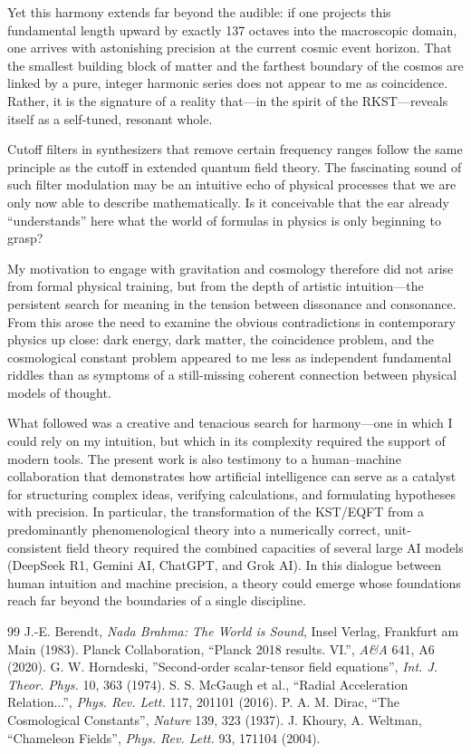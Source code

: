 \documentclass[11pt,a4paper]{article}
\begin{document}
Yet this harmony extends far beyond the audible: if one projects this fundamental length upward by exactly 137 octaves into the macroscopic domain, one arrives with astonishing precision at the current cosmic event horizon. That the smallest building block of matter and the farthest boundary of the cosmos are linked by a pure, integer harmonic series does not appear to me as coincidence. Rather, it is the signature of a reality that—in the spirit of the RKST—reveals itself as a self-tuned, resonant whole.

Cutoff filters in synthesizers that remove certain frequency ranges follow the same principle as the cutoff in extended quantum field theory. The fascinating sound of such filter modulation may be an intuitive echo of physical processes that we are only now able to describe mathematically. Is it conceivable that the ear already “understands” here what the world of formulas in physics is only beginning to grasp?

My motivation to engage with gravitation and cosmology therefore did not arise from formal physical training, but from the depth of artistic intuition—the persistent search for meaning in the tension between dissonance and consonance. From this arose the need to examine the obvious contradictions in contemporary physics up close: dark energy, dark matter, the coincidence problem, and the cosmological constant problem appeared to me less as independent fundamental riddles than as symptoms of a still-missing coherent connection between physical models of thought.

What followed was a creative and tenacious search for harmony—one in which I could rely on my intuition, but which in its complexity required the support of modern tools. The present work is also testimony to a human–machine collaboration that demonstrates how artificial intelligence can serve as a catalyst for structuring complex ideas, verifying calculations, and formulating hypotheses with precision. In particular, the transformation of the KST/EQFT from a predominantly phenomenological theory into a numerically correct, unit-consistent field theory required the combined capacities of several large AI models (DeepSeek R1, Gemini AI, ChatGPT, and Grok AI). In this dialogue between human intuition and machine precision, a theory could emerge whose foundations reach far beyond the boundaries of a single discipline.


\begin{thebibliography}{99}
 J.-E. Berendt, \textit{Nada Brahma: The World is Sound}, Insel Verlag, Frankfurt am Main (1983).
 Planck Collaboration, ``Planck 2018 results. VI.'', \textit{A\&A} 641, A6 (2020).
 G. W. Horndeski, ''Second-order scalar-tensor field equations'', \textit{Int. J. Theor. Phys.} 10, 363 (1974).
 S. S. McGaugh et al., ``Radial Acceleration Relation...'', \textit{Phys. Rev. Lett.} 117, 201101 (2016).
 P. A. M. Dirac, ``The Cosmological Constants'', \textit{Nature} 139, 323 (1937).
 J. Khoury, A. Weltman, ``Chameleon Fields'', \textit{Phys. Rev. Lett.} 93, 171104 (2004).
\end{thebibliography}
\end{document}

